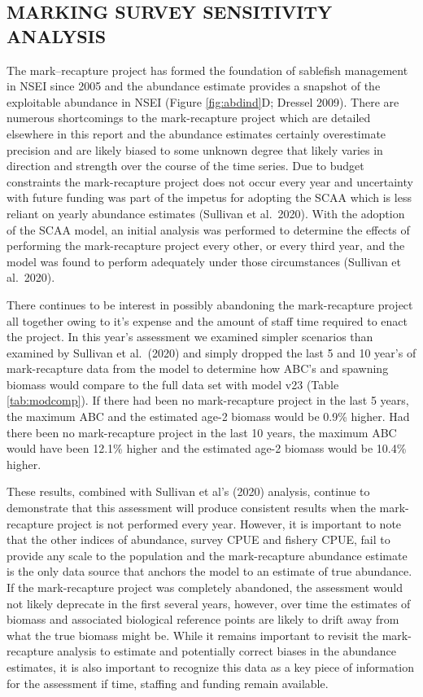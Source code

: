 \documentclass[
]{article}
\begin{document}
\hypertarget{marking-survey-sensitivity-analysis}{%
\subsection{MARKING SURVEY SENSITIVITY ANALYSIS}\label{marking-survey-sensitivity-analysis}}

The mark--recapture project has formed the foundation of sablefish management in NSEI since 2005 and the abundance estimate provides a snapshot of the exploitable abundance in NSEI (Figure \ref{fig:abdind}D; Dressel 2009). There are numerous shortcomings to the mark-recapture project which are detailed elsewhere in this report and the abundance estimates certainly overestimate precision and are likely biased to some unknown degree that likely varies in direction and strength over the course of the time series. Due to budget constraints the mark-recapture project does not occur every year and uncertainty with future funding was part of the impetus for adopting the SCAA which is less reliant on yearly abundance estimates (Sullivan et al.~2020). With the adoption of the SCAA model, an initial analysis was performed to determine the effects of performing the mark-recapture project every other, or every third year, and the model was found to perform adequately under those circumstances (Sullivan et al.~2020).

There continues to be interest in possibly abandoning the mark-recapture project all together owing to it's expense and the amount of staff time required to enact the project. In this year's assessment we examined simpler scenarios than examined by Sullivan et al.~(2020) and simply dropped the last 5 and 10 year's of mark-recapture data from the model to determine how ABC's and spawning biomass would compare to the full data set with model v23 (Table \ref{tab:modcomp}). If there had been no mark-recapture project in the last 5 years, the maximum ABC and the estimated age-2 biomass would be 0.9\% higher. Had there been no mark-recapture project in the last 10 years, the maximum ABC would have been 12.1\% higher and the estimated age-2 biomass would be 10.4\% higher.

These results, combined with Sullivan et al's (2020) analysis, continue to demonstrate that this assessment will produce consistent results when the mark-recapture project is not performed every year. However, it is important to note that the other indices of abundance, survey CPUE and fishery CPUE, fail to provide any scale to the population and the mark-recapture abundance estimate is the only data source that anchors the model to an estimate of true abundance. If the mark-recapture project was completely abandoned, the assessment would not likely deprecate in the first several years, however, over time the estimates of biomass and associated biological reference points are likely to drift away from what the true biomass might be. While it remains important to revisit the mark-recapture analysis to estimate and potentially correct biases in the abundance estimates, it is also important to recognize this data as a key piece of information for the assessment if time, staffing and funding remain available.
\end{document}

